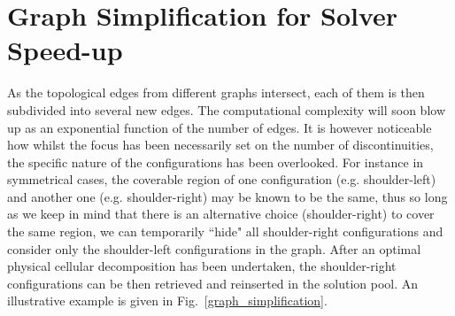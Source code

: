 \documentclass[letterpaper, 10pt, conference]{ieeeconf}
\begin{document}
\section{Graph Simplification for Solver Speed-up}
\label{sectiongraphsimplification}
As the topological edges from different graphs intersect, each of them is then subdivided into several new edges. The computational complexity will soon blow up as an exponential function of the number of edges. 
It is however noticeable how whilst the focus has been necessarily set on the number of discontinuities, the specific nature of the configurations has been overlooked. 
For instance in symmetrical cases, the coverable region of one configuration (e.g. shoulder-left) and another one (e.g. shoulder-right) may be known to be the same, thus so long as we keep in mind that there is an alternative choice (shoulder-right) to cover the same region, we can temporarily ``hide" all shoulder-right configurations and consider only the shoulder-left configurations in the graph. After an optimal physical cellular decomposition has been undertaken, the shoulder-right configurations can be then retrieved and reinserted in the solution pool. 
An illustrative example is given in Fig.~\ref{graph_simplification}.
\end{document}
